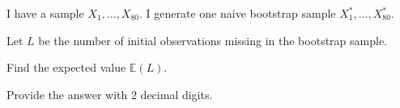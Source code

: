 
\begin{question}
I have a sample \(X_1, \ldots, X_{80}\).
I generate one naive bootstrap sample \(X^*_1, \ldots, X^*_{80}\).

Let \(L\) be the number of initial observations missing in the bootstrap sample.

Find the expected value \(\mathbb{E}(L)\).

Provide the answer with 2 decimal digits.
\end{question}


